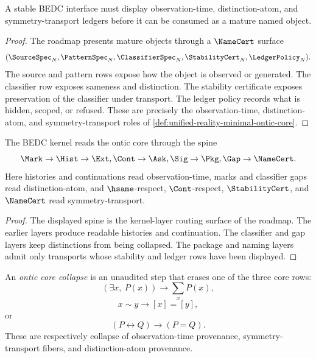 \begin{theorem}
\label{thm:unified-reality-stable-interfaces-require-ontic-core}
A stable BEDC interface must display observation-time, distinction-atom,
and symmetry-transport ledgers before it can be consumed as a mature
named object.
\end{theorem}

\begin{proof}
The roadmap presents mature objects through a $\NameCert$ surface
$$
(\SourceSpec_N,\PatternSpec_N,\ClassifierSpec_N,\StabilityCert_N,
\LedgerPolicy_N).
$$
The source and pattern rows expose how the object is observed or
generated. The classifier row exposes sameness and distinction. The
stability certificate exposes preservation of the classifier under
transport. The ledger policy records what is hidden, scoped, or refused.
These are precisely the observation-time, distinction-atom, and
symmetry-transport roles of
\autoref{def:unified-reality-minimal-ontic-core}.
\end{proof}

\begin{corollary}
\label{cor:unified-reality-kernel-reading-ontic-core}
The BEDC kernel reads the ontic core through the spine
$$
\Mark \to \Hist \to \Ext,\Cont \to \Ask,\Sig \to \Pkg,\Gap \to
\NameCert.
$$
Here histories and continuations read observation-time, marks and
classifier gaps read distinction-atom, and $\hsame$-respect,
$\Cont$-respect, $\StabilityCert$, and $\NameCert$ read
symmetry-transport.
\end{corollary}

\begin{proof}
The displayed spine is the kernel-layer routing surface of the roadmap.
The earlier layers produce readable histories and continuation. The
classifier and gap layers keep distinctions from being collapsed. The
package and naming layers admit only transports whose stability and
ledger rows have been displayed.
\end{proof}

\begin{definition}
\label{def:unified-reality-ontic-core-collapse}
An \emph{ontic core collapse} is an unaudited step that erases one of
the three core rows:
$$
(\exists x,\ P(x))\to\sum_x P(x),
$$
$$
x\sim y\to [x]=[y],
$$
or
$$
(P\leftrightarrow Q)\to(P=Q).
$$
These are respectively collapse of observation-time provenance,
symmetry-transport fibers, and distinction-atom provenance.
\end{definition}

